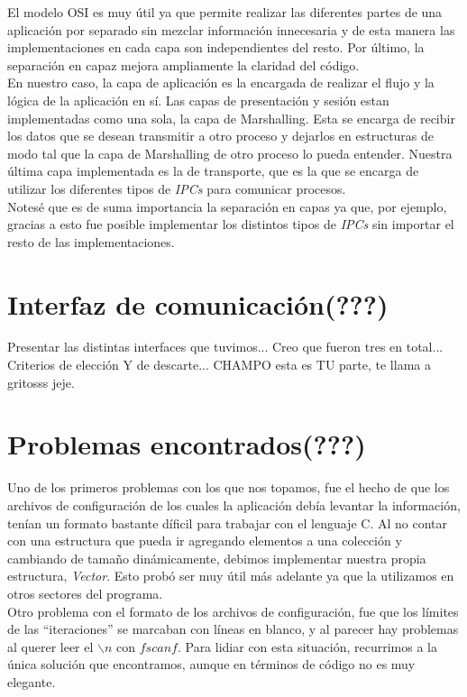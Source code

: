 \documentclass[a4paper,10pt]{article}
\begin{document}
El modelo OSI es muy útil ya que permite realizar las diferentes partes de una aplicación por separado sin mezclar información innecesaria y de esta manera las implementaciones 
en cada capa son independientes del resto. Por último, la separación en capaz mejora ampliamente la claridad del código.\\

En nuestro caso, la capa de aplicación es la encargada de realizar el flujo y la lógica de la aplicación en sí. Las capas de presentación y sesión estan implementadas como una sola,
 la capa de Marshalling. Esta se encarga de recibir los datos que se desean transmitir a otro proceso y dejarlos en estructuras de modo tal que la capa de Marshalling de otro proceso 
 lo pueda entender. Nuestra última capa implementada es la de transporte, que es la que se encarga de utilizar los diferentes tipos de \textit{IPCs} para comunicar procesos.\\

Notesé que es de suma importancia la separación en capas ya que, por ejemplo, gracias a esto fue posible implementar los distintos tipos de \textit{IPCs} sin importar el resto de las implementaciones.\\

\newpage
\section{Interfaz de comunicación(???)}
Presentar las distintas interfaces que tuvimos...
Creo que fueron tres en total... 
Criterios de elección Y de descarte...
CHAMPO esta es TU parte, te llama a gritosss jeje.

\newpage
\section{Problemas encontrados(???)}

Uno de los primeros problemas con los que nos topamos, fue el hecho de que los archivos de configuración de los cuales la aplicación debía levantar la información, tenían un formato
bastante díficil para trabajar con el lenguaje C. Al no contar con una estructura que pueda ir agregando elementos a una colección y cambiando de tamaño dinámicamente, debimos 
implementar nuestra propia estructura, \textit{Vector}. Esto probó ser muy útil más adelante ya que la utilizamos en otros sectores del programa.\\

Otro problema con el formato de los archivos de configuración, fue que los límites de las ``iteraciones'' se marcaban con líneas en blanco, y al parecer hay problemas al querer leer el 
$\backslash n$ con $fscanf$. Para lidiar con esta situación, recurrimos a la única solución que encontramos, aunque en términos de código no es muy elegante.\\
\end{document}
